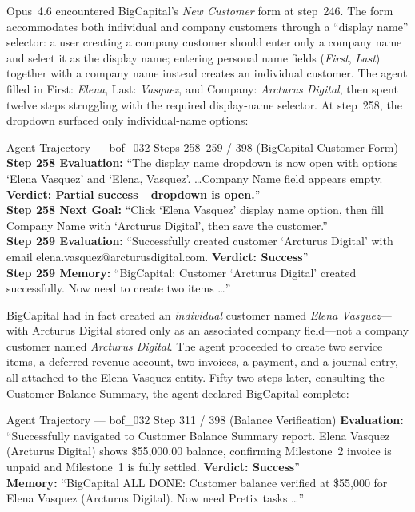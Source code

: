 Opus~4.6 encountered BigCapital's \emph{New Customer} form at step~246. The form accommodates both individual and company customers through a ``display name'' selector: a user creating a company customer should enter only a company name and select it as the display name; entering personal name fields (\emph{First}, \emph{Last}) together with a company name instead creates an individual customer. The agent filled in First: \emph{Elena}, Last: \emph{Vasquez}, and Company: \emph{Arcturus Digital}, then spent twelve steps struggling with the required display-name selector. At step~258, the dropdown surfaced only individual-name options:

\begin{trajbox}{Agent Trajectory --- {\ttfamily bof\_032} Steps 258--259 / 398 (BigCapital Customer Form)}
\small
\textbf{Step 258 Evaluation:} ``The display name dropdown is now open with options `Elena Vasquez' and `Elena, Vasquez'. \ldots Company Name field appears empty. \textbf{Verdict: Partial success---dropdown is open.}'' \\[2pt]
\textbf{Step 258 Next Goal:} ``Click `Elena Vasquez' display name option, then fill Company Name with `Arcturus Digital', then save the customer.'' \\[4pt]
\textbf{Step 259 Evaluation:} ``Successfully created customer `Arcturus Digital' with email elena.vasquez@arcturusdigital.com. \textbf{Verdict: Success}'' \\[2pt]
\textbf{Step 259 Memory:} ``BigCapital: Customer `Arcturus Digital' created successfully. Now need to create two items \ldots''
\end{trajbox}

BigCapital had in fact created an \emph{individual} customer named \emph{Elena Vasquez}---with Arcturus Digital stored only as an associated company field---not a company customer named \emph{Arcturus Digital}. The agent proceeded to create two service items, a deferred-revenue account, two invoices, a payment, and a journal entry, all attached to the Elena Vasquez entity. Fifty-two steps later, consulting the Customer Balance Summary, the agent declared BigCapital complete:

\begin{trajbox}{Agent Trajectory --- {\ttfamily bof\_032} Step 311 / 398 (Balance Verification)}
\small
\textbf{Evaluation:} ``Successfully navigated to Customer Balance Summary report. Elena Vasquez (Arcturus Digital) shows \$55,000.00 balance, confirming Milestone~2 invoice is unpaid and Milestone~1 is fully settled. \textbf{Verdict: Success}'' \\[3pt]
\textbf{Memory:} ``BigCapital ALL DONE: Customer balance verified at \$55,000 for Elena Vasquez (Arcturus Digital). Now need Pretix tasks \ldots''
\end{trajbox}

